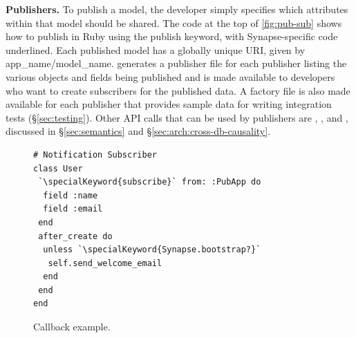 {\bf Publishers.} 
To publish a model, the developer simply specifies which attributes within that
model should be shared.
The code at the top of
\F\ref{fig:pub-sub} shows how to publish
in Ruby using the {\code publish} keyword, with Synapse-specific code
underlined.  
Each published model has a globally unique URI, given by {\code
app\_name/model\_name}.  \synapse generates a publisher file for each
publisher listing the various objects and fields being published and is made
available to developers who want to create subscribers for the published data.
A factory file is also made available for each publisher that provides sample
data for writing integration tests (\S\ref{sec:testing}). 
Other API calls that
can be used by publishers are {}, {}, and {}, discussed in
\S\ref{sec:semantics} and \S\ref{sec:arch:cross-db-causality}.

\begin{figure}
\centering
\begin{minipage}{.4\textwidth}
\begin{lstlisting}[framexleftmargin=5pt]
# Notification Subscriber
class User
 `\specialKeyword{subscribe}` from: :PubApp do
  field :name
  field :email
 end
 after_create do
  unless `\specialKeyword{Synapse.bootstrap?}`
   self.send_welcome_email
  end
 end
end
\end{lstlisting}
\end{minipage}
\caption{Callback example.}
\label{fig:welcome-email}
\end{figure}

